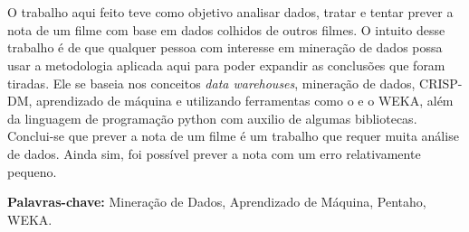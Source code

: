 \section*{}
O trabalho aqui feito teve como objetivo analisar dados, tratar e tentar prever a nota de um filme com base em dados colhidos de outros filmes. O intuito desse trabalho é de que qualquer pessoa com interesse em mineração de dados possa usar a metodologia aplicada aqui para poder expandir as conclusões que foram tiradas. Ele se baseia nos conceitos \textit{data warehouses}, mineração de dados, CRISP-DM, aprendizado de máquina e utilizando ferramentas como o \pdi e o WEKA, além da linguagem de programação python com auxilio de algumas bibliotecas.
Conclui-se que prever a nota de um filme é um trabalho que requer muita análise de dados. Ainda sim, foi possível prever a nota com um erro relativamente pequeno.

{\bf Palavras-chave:} Mineração de Dados,  Aprendizado de Máquina, Pentaho, WEKA.